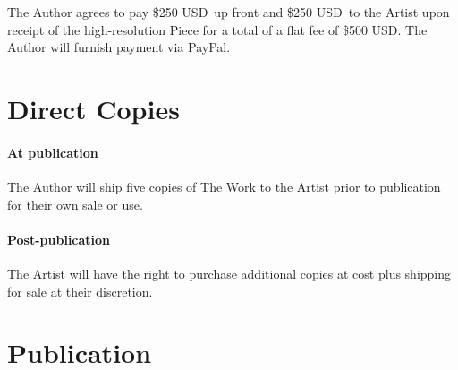 \documentclass[12pt,letterpaper]{article}
\def\UpFront{\$250 USD}
\def\AtCompletion{\$250 USD}
\def\FlatFee{\$500 USD}
\def\PrintRoyalties{25\%}
\def\DigitalRoyalties{50\%}
\def\PaymentMechanism{PayPal} %
\begin{document}
The Author agrees to pay \UpFront\ up front and \AtCompletion\ to the Artist upon receipt of the high-resolution Piece for a total of a flat fee of \FlatFee. The Author will furnish payment via \PaymentMechanism.

%
%
%
%
%
%
%

\section{Direct Copies}

\paragraph{At publication} The Author will ship five copies of The Work to the Artist prior to publication for their own sale or use.

\paragraph{Post-publication} The Artist will have the right to purchase additional copies at cost plus shipping for sale at their discretion.

\section{Publication}
\end{document}
